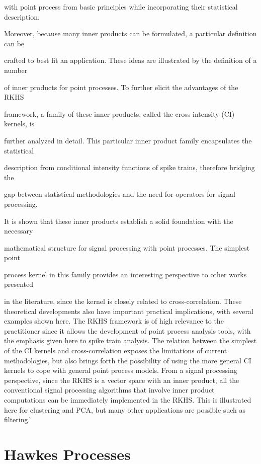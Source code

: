 \documentclass{amsart}
\begin{document}
with point process from basic principles while incorporating their statistical
description.

Moreover, because many inner products can be formulated, a particular
definition can be

crafted to best fit an application. These ideas are illustrated by the
definition of a number

of inner products for point processes. To further elicit the advantages of the
RKHS

framework, a family of these inner products, called the cross-intensity (CI)
kernels, is

further analyzed in detail. This particular inner product family encapsulates
the statistical

description from conditional intensity functions of spike trains, therefore
bridging the

gap between statistical methodologies and the need for operators for signal
processing.

It is shown that these inner products establish a solid foundation with the
necessary

mathematical structure for signal processing with point processes. The
simplest point

process kernel in this family provides an interesting perspective to other
works presented

in the literature, since the kernel is closely related to cross-correlation.
These theoretical developments also have important practical implications,
with several examples shown here. The RKHS framework is of high relevance to
the practitioner since it allows the development of point process analysis
tools, with the emphasis given here to spike train analysis. The relation
between the simplest of the CI kernels and cross-correlation exposes the
limitations of current methodologies, but also brings forth the possibility of
using the more general CI kernels to cope with general point process models.
From a signal processing perspective, since the RKHS is a vector space with an
inner product, all the conventional signal processing algorithms that involve
inner product computations can be immediately implemented in the RKHS. This is
illustrated here for clustering and PCA, but many other applications are
possible such as filtering.'

\section{Hawkes Processes}
\end{document}
